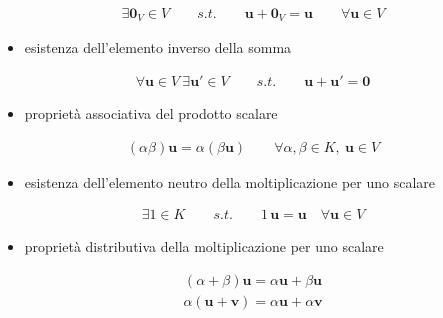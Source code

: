 \documentclass[letterpaper,10pt,english]{jupyterBook}
\begin{document}
\begin{equation*}
\begin{split}\exists \mathbf{0}_V \in V \qquad s.t. \qquad \mathbf{u} + \mathbf{0}_V = \mathbf{u} \qquad \forall \mathbf{u} \in V\end{split}
\end{equation*}\begin{itemize}
\item {} 
\sphinxAtStartPar
esistenza dell’elemento inverso della somma

\end{itemize}
\begin{equation*}
\begin{split}\forall \mathbf{u} \in V \ \exists \mathbf{u}' \in V \qquad s.t. \qquad \mathbf{u} + \mathbf{u}' = \mathbf{0}\end{split}
\end{equation*}\begin{itemize}
\item {} 
\sphinxAtStartPar
proprietà associativa del prodotto scalare

\end{itemize}
\begin{equation*}
\begin{split}(\alpha \beta) \mathbf{u} = \alpha ( \beta \mathbf{u} ) \qquad \forall \alpha, \beta \in K, \ \mathbf{u} \in V\end{split}
\end{equation*}\begin{itemize}
\item {} 
\sphinxAtStartPar
esistenza dell’elemento neutro della moltiplicazione per uno scalare

\end{itemize}
\begin{equation*}
\begin{split}\exists 1 \in K \qquad s.t. \qquad 1 \, \mathbf{u} = \mathbf{u} \quad \forall \mathbf{u} \in V\end{split}
\end{equation*}\begin{itemize}
\item {} 
\sphinxAtStartPar
proprietà distributiva della moltiplicazione per uno scalare

\end{itemize}
\begin{equation*}
\begin{split}(\alpha + \beta) \mathbf{u} = \alpha \mathbf{u} + \beta \mathbf{u}\end{split}
\end{equation*}\begin{equation*}
\begin{split}\alpha (\mathbf{u} + \mathbf{v}) = \alpha \mathbf{u} + \alpha \mathbf{v} \end{split}
\end{equation*}
\end{document}
